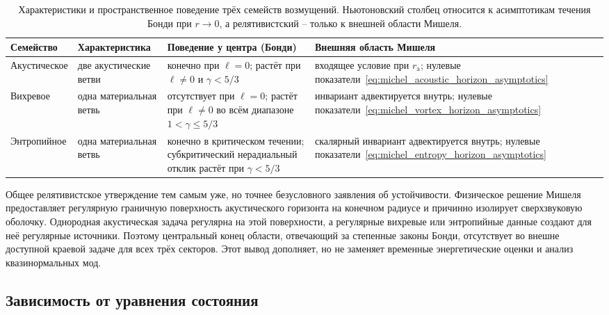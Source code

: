 \documentclass[12pt,a4paper,preprint,nopreprintline]{elsarticle}
\begin{document}
\begin{table}[ht]
\centering
\caption{Характеристики и пространственное поведение трёх семейств возмущений. Ньютоновский столбец относится к асимптотикам течения Бонди при $r\rightarrow0$, а релятивистский -- только к внешней области Мишеля.}
\label{tab:mode_stability_summary}
\small
\setlength{\tabcolsep}{4pt}
\renewcommand{\arraystretch}{1.15}
\begin{tabular}{
    >{\raggedright\arraybackslash}p{2.4cm}
    >{\raggedright\arraybackslash}p{2.9cm}
    >{\raggedright\arraybackslash}p{4.5cm}
    >{\raggedright\arraybackslash}p{4.7cm}}
\toprule
Семейство & Характеристика & Поведение у центра (Бонди) & Внешняя область Мишеля \\
\midrule
Акустическое & две акустические ветви & конечно при $\ell=0$; растёт при $\ell\neq0$ и $\gamma<5/3$ & входящее условие при $r_{\mathrm{a}}$; нулевые показатели~\eqref{eq:michel_acoustic_horizon_asymptotics} \\
Вихревое & одна материальная ветвь & отсутствует при $\ell=0$; растёт при $\ell\neq0$ во всём диапазоне $1<\gamma\leq5/3$ & инвариант адвектируется внутрь; нулевые показатели~\eqref{eq:michel_vortex_horizon_asymptotics} \\
Энтропийное & одна материальная ветвь & конечно в критическом течении; субкритический нерадиальный отклик растёт при $\gamma<5/3$ & скалярный инвариант адвектируется внутрь; нулевые показатели~\eqref{eq:michel_entropy_horizon_asymptotics} \\
\bottomrule
\end{tabular}
\end{table}

Общее релятивистское утверждение тем самым уже, но точнее безусловного заявления об устойчивости. Физическое решение Мишеля предоставляет регулярную граничную поверхность акустического горизонта на конечном радиусе и причинно изолирует сверхзвуковую оболочку. Однородная акустическая задача регулярна на этой поверхности, а регулярные вихревые или энтропийные данные создают для неё регулярные источники. Поэтому центральный конец области, отвечающий за степенные законы Бонди, отсутствует во внешне доступной краевой задаче для всех трёх секторов. Этот вывод дополняет, но не заменяет временные энергетические оценки и анализ квазинормальных мод.

\subsection{Зависимость от уравнения состояния}
\label{sec:parameter_dependence}
\end{document}

